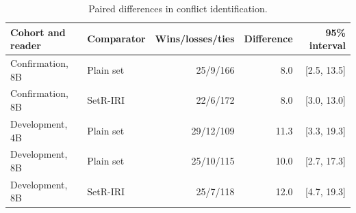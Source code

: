 \begin{table}[pos=H]
\caption{Paired differences in conflict identification.}\label{tab:paired}
\centering\small
\setlength{\tabcolsep}{6pt}
\begin{tabular}{llrrr}
\toprule
Cohort and reader & Comparator & Wins/losses/ties & Difference & 95\% interval \\
\midrule
Confirmation, 8B & Plain set & 25/9/166 & 8.0 & [2.5, 13.5] \\
Confirmation, 8B & SetR-IRI & 22/6/172 & 8.0 & [3.0, 13.0] \\
Development, 4B & Plain set & 29/12/109 & 11.3 & [3.3, 19.3] \\
Development, 8B & Plain set & 25/10/115 & 10.0 & [2.7, 17.3] \\
Development, 8B & SetR-IRI & 25/7/118 & 12.0 & [4.7, 19.3] \\
\bottomrule
\end{tabular}
\end{table}
